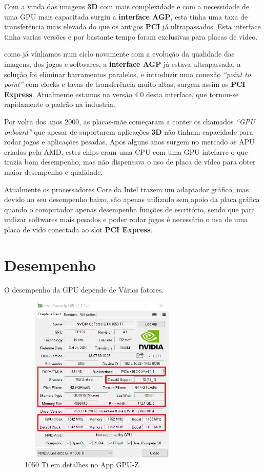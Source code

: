 \documentclass{report}
\begin{document}
Com a vinda das imagens \textbf{3D} com mais complexidade e com a necessidade de uma \ac{GPU} mais capacitada surgiu a \textbf{interface AGP}, esta tinha uma taxa de transferência mais elevada do que os antigos \textbf{PCI} já ultrapassados. Esta interface tinha varias versões e por bastante tempo foram exclusivas para placas de video.

como já vínhamos num ciclo novamente com a evolução da qualidade das imagens, dos jogos e softwares, a \textbf{interface AGP} já estava ultrapassada, a solução foi eliminar barramentos paralelos, e introduzir uma conexão \textit{“point to point”} com clocks e tavas de transferência muito altas, surgem assim os \textbf{PCI Express}. Atualmente estamos na versão 4.0 desta interface, que tornou-se rapidamente o padrão na industria.

Por volta dos anos 2000, as placas-mãe começaram a conter os chamados \textit{“GPU onboard”} que apesar de suportarem aplicações \textbf{3D} não tinham capacidade para rodar jogos e aplicações pesadas. Apos alguns anos surgem no mercado as \ac{APU} criados pela AMD, estes chips eram uma \ac{CPU} com uma \ac{GPU} intefarre o que trazia bom desempenho, mas não dispensava o uso de placa de vídeo para obter maior desempenho e qualidade.

Atualmente os processadores Core da Intel trazem um adaptador gráfico, mas devido ao seu desempenho baixo, são apenas utilizado sem apoio da placa gráfica quando o computador apenas desempenha funções de escritório, sendo que para utilizar softwares mais pesados e poder rodar jogos é necessário o usa de uma placa de vido conectada ao slot \textbf{PCI Express}.  

\section{Desempenho}
\label{sect.Desempelnho}
O desempenho da \ac{GPU} depende de Vários fatores.

 
\begin{figure}
\center
\includegraphics[width=8cm, height=8cm]{Imagens/desempenho.png}
\caption{1050 Ti em detalhes no App GPU-Z.}
\end{figure} 
\end{document}
